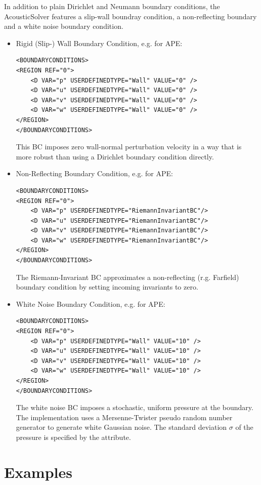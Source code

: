 In addition to plain Dirichlet and Neumann boundary conditions, the AcousticSolver features a slip-wall boundray condition, a non-reflecting boundary and a white noise boundary condition.
\begin{itemize}
\item Rigid (Slip-) Wall Boundary Condition, e.g. for APE:
\begin{lstlisting}[style=XmlStyle]
<BOUNDARYCONDITIONS>
<REGION REF="0">
    <D VAR="p" USERDEFINEDTYPE="Wall" VALUE="0" />
    <D VAR="u" USERDEFINEDTYPE="Wall" VALUE="0" />
    <D VAR="v" USERDEFINEDTYPE="Wall" VALUE="0" />
    <D VAR="w" USERDEFINEDTYPE="Wall" VALUE="0" />
</REGION>
</BOUNDARYCONDITIONS>
\end{lstlisting}
This BC imposes zero wall-normal perturbation velocity in a way that is more robust than using a Dirichlet boundary condition directly.

\item Non-Reflecting Boundary Condition, e.g. for APE:
\begin{lstlisting}[style=XmlStyle]
<BOUNDARYCONDITIONS>
<REGION REF="0">
    <D VAR="p" USERDEFINEDTYPE="RiemannInvariantBC"/>
    <D VAR="u" USERDEFINEDTYPE="RiemannInvariantBC"/>
    <D VAR="v" USERDEFINEDTYPE="RiemannInvariantBC"/>
    <D VAR="w" USERDEFINEDTYPE="RiemannInvariantBC"/>
</REGION>
</BOUNDARYCONDITIONS>
\end{lstlisting}
The Riemann-Invariant BC approximates a non-reflecting (r.g. Farfield)  boundary condition by setting incoming invariants to zero.

\item White Noise Boundary Condition, e.g. for APE:
\begin{lstlisting}[style=XmlStyle]
<BOUNDARYCONDITIONS>
<REGION REF="0">
    <D VAR="p" USERDEFINEDTYPE="Wall" VALUE="10" />
    <D VAR="u" USERDEFINEDTYPE="Wall" VALUE="10" />
    <D VAR="v" USERDEFINEDTYPE="Wall" VALUE="10" />
    <D VAR="w" USERDEFINEDTYPE="Wall" VALUE="10" />
</REGION>
</BOUNDARYCONDITIONS>
\end{lstlisting}
The white noise BC imposes a stochastic, uniform pressure at the boundary. The implementation uses a Mersenne-Twister pseudo random number generator to generate white Gaussian noise.
The standard deviation $\sigma$ of the pressure  is specified by the  attribute.

\end{itemize}


\section{Examples}
